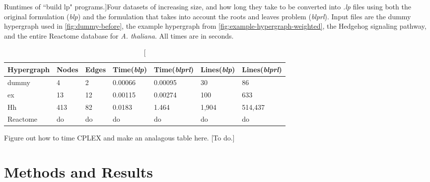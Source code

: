 \documentclass[12pt,twoside]{reedthesis}
\newcommand{\new}[2]{{\color{red}#1 [#2]}}
\theoremstyle{definition}
\begin{document}
\begin{table}[!h]
\begin{center}
  \label{tab:build_lp_runtimes}
  \caption[Runtimes of ``build lp" programs.]{Four datasets of increasing size, and how long they take to be converted into \textit{.lp} files using both the original formulation (\textit{blp}) and the formulation that takes into account the roots and leaves problem (\textit{blprl}). Input files are the dummy hypergraph used in \ref{fig:dummy-before}, the example hypergraph from \ref{fig:example-hypergraph-weighted}, the Hedgehog signaling pathway, and the entire Reactome database for \textit{A. thaliana}. All times are in seconds.}
\begin{tabular}{ |l||l|l|l|l|l|l| }%
  \hline%
  Hypergraph & Nodes & Edges & Time(\textit{blp}) & Time(\textit{blprl}) & Lines(\textit{blp}) & Lines(\textit{blprl}) \\%
  \hline \hline
  dummy & 4 & 2 & 0.00066 & 0.00095 & 30 & 86 \\ \hline%
  ex & 13 & 12 & 0.00115 & 0.00274 & 100 & 633 \\ \hline%
  Hh & 413 & 82 & 0.0183 & 1.464 & 1,904 & 514,437  \\ \hline%
  Reactome & do & do & do & do & do & do \\ \hline%
\end{tabular}%
\end{center}
\end{table}

\new{
Figure out how to time CPLEX and make an analagous table here.
}{To do.}


\chapter{Methods and Results}
\end{document}
